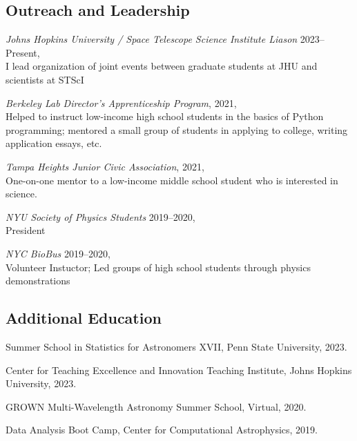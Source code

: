 \documentclass[12pt,letterpaper]{article}
\begin{document}
\subsection{Outreach and Leadership}
\begin{list}{}{\cvlist}

\item \emph{Johns Hopkins University / Space Telescope Science Institute Liason} 2023--Present, \\ I lead organization of joint events between graduate students at JHU and scientists at STScI

\item \emph{Berkeley Lab Director's Apprenticeship Program}, 2021, \\ Helped to instruct low-income high school students in the basics of Python programming; mentored a small group of students in applying to college, writing application essays, etc.

\item \emph{Tampa Heights Junior Civic Association}, 2021, \\ One-on-one mentor to a low-income middle school student who is interested in science.

\item \emph{NYU Society of Physics Students} 2019--2020, \\ President

\item \emph{NYC BioBus} 2019--2020, \\ Volunteer Instuctor; Led groups of high school students through physics demonstrations
    
\end{list}

\subsection{Additional Education}
\begin{list}{}{\cvlist}
    \item Summer School in Statistics for Astronomers XVII, Penn State University, 2023.
    \item Center for Teaching Excellence and Innovation Teaching Institute, Johns Hopkins University, 2023.
    \item GROWN Multi-Wavelength Astronomy Summer School, Virtual, 2020.
    \item Data Analysis Boot Camp, Center for Computational Astrophysics, 2019.
    
\end{list}
\end{document}
